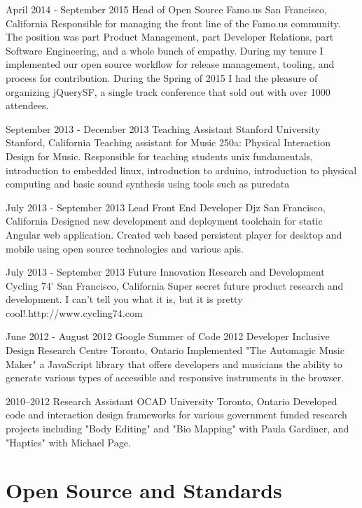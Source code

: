 \documentclass[10pt,a4paper,sans]{moderncv}   %
\begin{document}
\cventry
  {April 2014 - September 2015}
  {Head of Open Source}
  {Famo.us}
  {San Francisco, California}{}
  {Responsible for managing the front line of the Famo.us community. The position was part Product Management, part Developer Relations, part Software Engineering, and a whole bunch of empathy.  During my tenure I implemented our open source workflow for release management, tooling, and process for contribution. During the Spring of 2015 I had the pleasure of organizing jQuerySF, a single track conference that sold out with over 1000 attendees.}

\cventry
  {September 2013 - December 2013}
  {Teaching Assistant}
  {Stanford University}
  {Stanford, California}{}
  {Teaching assistant for Music 250a: Physical Interaction Design for Music.  Responsible for teaching students unix fundamentals, introduction to embedded linux, introduction to arduino, introduction to physical computing and basic sound synthesis using tools such as puredata}

\cventry
  {July 2013 - September 2013}
  {Lead Front End Developer}
  {Djz}
  {San Francisco, California}{}
  {Designed new development and deployment toolchain for static Angular web application.  Created web based persistent player for desktop and mobile using open source technologies and various apis.}

\cventry
  {July 2013 - September 2013}
  {Future Innovation Research and Development}
  {Cycling 74'}
  {San Francisco, California}{}
  {Super secret future product research and development. I can't tell you what it is, but it is pretty cool!.\newline{}http://www.cycling74.com}

\cventry
  {June 2012 - August 2012}
  {Google Summer of Code 2012 Developer}
  {Inclusive Design Research Centre}
  {Toronto, Ontario}{}
  {Implemented "The Automagic Music Maker" a JavaScript library that offers developers and musicians the ability to generate various types of accessible and responsive instruments in the browser.}

 \cventry
   {2010--2012}
   {Research Assistant}
   {OCAD University}
   {Toronto, Ontario}{}
   {Developed code and interaction design frameworks for various government funded research projects including "Body Editing" and "Bio Mapping" with Paula Gardiner, and "Haptics" with Michael Page.}

\section{Open Source and Standards}
\end{document}
